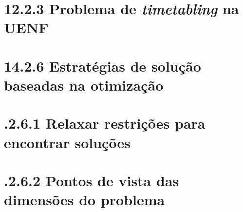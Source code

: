 


\chapter*{12.2.3 Problema de \textit{timetabling} na UENF}

\cite{SanyaSantos2013}

\cite{RicardoSilveira2014}







\chapter*{14.2.6 Estratégias de solução baseadas na otimização}

\chapter*{.2.6.1 Relaxar restrições para encontrar soluções}

\cite{Dunke2023}

\cite{Souza2000}

\chapter*{.2.6.2 Pontos de vista das dimensões do problema}

\cite{Piechowiak2004}

